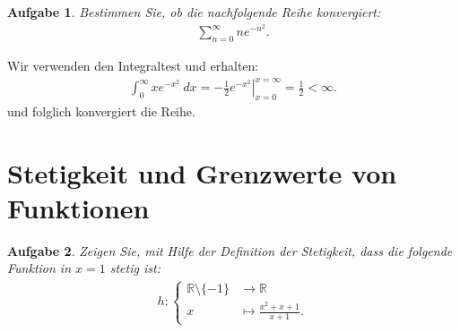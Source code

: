 \documentclass[a4paper, 20]{exam}
\newtheorem{ex}{Aufgabe}
\begin{document}
\begin{ex} Bestimmen Sie, ob die nachfolgende Reihe konvergiert:
\begin{align*}
\sum_{n=0}^\infty ne^{-n^2}.
\end{align*}
\end{ex}

\begin{solution} Wir verwenden den Integraltest und erhalten:
\begin{align*}
\int_0^\infty xe^{-x^2} ~dx = \left. - \frac{1}{2}e^{-x^2}\right|_{x=0}^{x=\infty} = \frac{1}{2} < \infty.
\end{align*}
und folglich konvergiert die Reihe. 
\end{solution}
\newpage


\section{Stetigkeit und Grenzwerte von Funktionen}


\begin{ex}
Zeigen Sie, mit Hilfe der Definition der Stetigkeit, dass die folgende Funktion in $x=1$ stetig ist:
\begin{align*}
h: \begin{cases} \mathbb{R} \setminus \lbrace -1 \rbrace & \longrightarrow \mathbb{R} \\
x & \longmapsto \frac{x^2+x+1}{x+1}. \end{cases}
\end{align*}
\end{ex}
\end{document}
